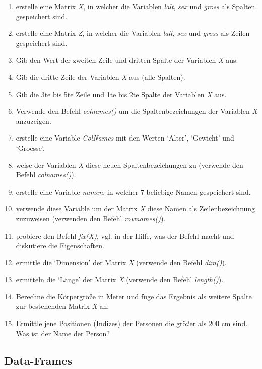 \documentclass[]{article}
\providecommand{\tightlist}{%
  \setlength{\itemsep}{0pt}\setlength{\parskip}{0pt}}
\begin{document}
\begin{enumerate}
\def\labelenumi{\arabic{enumi}.}
\tightlist
\item
  erstelle eine Matrix \emph{X}, in welcher die Variablen \emph{lalt},
  \emph{sex} und \emph{gross} als Spalten gespeichert sind.
\item
  erstelle eine Matrix \emph{Z}, in welcher die Variablen \emph{lalt},
  \emph{sex} und \emph{gross} als Zeilen gespeichert sind.
\item
  Gib den Wert der zweiten Zeile und dritten Spalte der Variablen
  \emph{X} aus.
\item
  Gib die dritte Zeile der Variablen \emph{X} aus (alle Spalten).
\item
  Gib die 3te bis 5te Zeile und 1te bis 2te Spalte der Variablen
  \emph{X} aus.
\item
  Verwende den Befehl \emph{colnames()} um die Spaltenbezeichungen der
  Variablen \emph{X} anzuzeigen.
\item
  erstelle eine Variable \emph{ColNames} mit den Werten `Alter',
  `Gewicht' und `Groesse'.
\item
  weise der Variablen \emph{X} diese neuen Spaltenbezeichungen zu
  (verwende den Befehl \emph{colnames()}).
\item
  erstelle eine Variable \emph{namen}, in welcher 7 beliebige Namen
  gespeichert sind.
\item
  verwende diese Variable um der Matrix \emph{X} diese Namen als
  Zeilenbezeichnung zuzuweisen (verwenden den Befehl \emph{rownames()}).
\item
  probiere den Befehl \emph{fix(X)}, vgl. in der Hilfe, was der Befehl
  macht und diskutiere die Eigenschaften.
\item
  ermittle die `Dimension' der Matrix \emph{X} (verwende den Befehl
  \emph{dim()}).
\item
  ermitteln die `Länge' der Matrix \emph{X} (verwende den Befehl
  \emph{length()}).
\item
  Berechne die Körpergröße in Meter und füge das Ergebnis als weitere
  Spalte zur bestehenden Matrix \emph{X} an.
\item
  Ermittle jene Positionen (Indizes) der Personen die größer als 200 cm
  sind. Was ist der Name der Person?
\end{enumerate}

\subsection*{Data-Frames}\label{data-frames}
\end{document}
